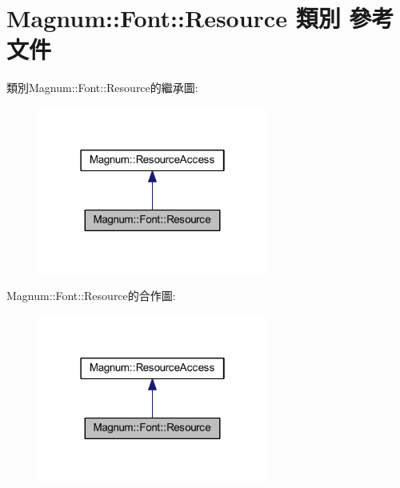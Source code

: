 \hypertarget{class_magnum_1_1_font_1_1_resource}{}\section{Magnum\+:\+:Font\+:\+:Resource 類別 參考文件}
\label{class_magnum_1_1_font_1_1_resource}


類別\+Magnum\+:\+:Font\+:\+:Resource的繼承圖\+:\nopagebreak
\begin{figure}[H]
\begin{center}
\leavevmode
\includegraphics[width=214pt]{class_magnum_1_1_font_1_1_resource__inherit__graph}
\end{center}
\end{figure}


Magnum\+:\+:Font\+:\+:Resource的合作圖\+:\nopagebreak
\begin{figure}[H]
\begin{center}
\leavevmode
\includegraphics[width=214pt]{class_magnum_1_1_font_1_1_resource__coll__graph}
\end{center}
\end{figure}
